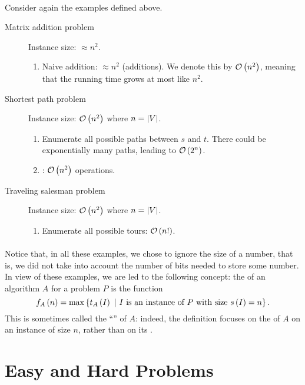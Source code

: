\paragraph{}
Consider again the examples defined above.
\begin{description}
 \item[Matrix addition problem] Instance size: $\approx n^2$.
 \begin{enumerate}
  \item Naive addition: $\approx n^2$ (additions). We denote this by $\mathcal{O}\left( n^2 \right)$, meaning that the running time grows at most like $n^2$.
 \end{enumerate}
 \item[Shortest path problem] Instance size: $\mathcal{O}\left( n^2 \right)$ where $n=\left| V \right|$.
 \begin{enumerate}
  \item Enumerate all possible paths between $s$ and $t$. There could be exponentially many paths, leading to $\mathcal{O}\left( 2^n \right)$.
  \item {}: $\mathcal{O}\left( n^2 \right)$ operations.
 \end{enumerate}
 \item[Traveling salesman problem] Instance size: $\mathcal{O}\left( n^2 \right)$ where $n=\left| V \right|$.
 \begin{enumerate}
  \item Enumerate all possible tours: $\mathcal{O}\left( n! \right)$.
 \end{enumerate}
\end{description}

\paragraph{}
Notice that, in all these examples, we chose to ignore the size of a number, that is, we did not take into account the number of bits needed to store some number. In view of these examples, we are led to the following concept: the  of an algorithm $A$ for a problem $P$ is the function 
\begin{equation}
f_A\left( n \right)=\max\left\{ t_A\left( I \right)\ |\ \mbox{$I$ is an instance of $P$ with size $s\left( I \right)=n$} \right\}.
\end{equation}
This is sometimes called the ``'' of $A$: indeed, the definition focuses on the  of $A$ on an instance of size $n$, rather than on its .

\section{Easy and Hard Problems}

